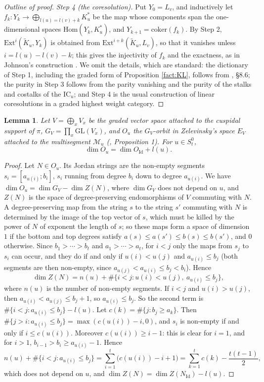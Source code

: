 \documentclass[a4paper,12pt,leqno]{amsart}
\newcommand{\caM}{\mathcal{M}}
\theoremstyle{plain}
\newtheorem{lemma}[thm]{Lemma}
\theoremstyle{definition}
\theoremstyle{definition}
\newcommand{\Id}{\mathrm{Id}}
\begin{document}
\begin{proof}[Outline of proof]
\emph{Step 4 (the coresolution).} Put $Y_0=L_v$, and inductively let $f_k:Y_k\to\bigoplus_{l(u)=l(v)+k}
K_u^*$ be the map whose components span the one-dimensional spaces $\mathrm{Hom}(Y_k,K_u^*)$, and
$Y_{k+1}=\mathrm{coker}(f_k)$. By Step 2, $\mathrm{Ext}^i(\widetilde K_u,Y_k)$ is obtained from
$\mathrm{Ext}^{i+k}(\widetilde K_u,L_v)$, so that it vanishes unless $i=l(u)-l(v)-k$; this gives the
injectivity of $f_k$ and the exactness, as in Johnson's construction \cite{Joh84}. We omit the details, which are standard: the dictionary of
Step 1, including the graded form of Proposition \ref{fact:KL}, follows from \cite{CG97}, \S8.6; the
purity in Step 3 follows from the parity vanishing and the purity of the stalks and costalks of the
$\mathrm{IC}_u$; and Step 4 is the usual construction of linear coresolutions in a graded highest
weight category.
\end{proof}

\begin{lemma}\label{lem:dimorb} Let $V=\bigoplus_xV_x$ be the graded vector space attached to the
cuspidal support of $\pi$, $G_V=\prod_x\mathrm{GL}(V_x)$, and $O_u$ the $G_V$-orbit in Zelevinsky's
space $E_V$ attached to the multisegment $\caM_u$ (\cite{Zel85}, Proposition 1). For $u\in S_t^0$,
\[\dim O_u=\dim O_{\Id}+l(u).\]
\end{lemma}

\begin{proof}
Let $N\in O_u$. Its Jordan strings are the non-empty segments $s_i=[a_{u(i)};b_i]$, $s_i$ running from
degree $b_i$ down to degree $a_{u(i)}$. We have $\dim O_u=\dim G_V-\dim Z(N)$, where $\dim G_V$ does not
depend on $u$, and $Z(N)$ is the space of degree-preserving endomorphisms of $V$ commuting with $N$.
A degree-preserving map from the string $s$ to the string $s'$ commuting with $N$ is determined by the
image of the top vector of $s$, which must be killed by the power of $N$ of exponent the length of $s$;
so these maps form a space of dimension $1$ if the bottom and top degrees satisfy
$a(s)\leq a(s')\leq b(s)\leq b(s')$, and $0$ otherwise. Since $b_1>\cdots>b_t$ and $a_1>\cdots>a_t$, for
$i<j$ only the maps from $s_j$ to $s_i$ can occur, and they do if and only if $u(i)<u(j)$ and
$a_{u(i)}\leq b_j$ (both segments are then non-empty, since $a_{u(j)}<a_{u(i)}\leq b_j<b_i$). Hence
\[\dim Z(N)=n(u)+\#\{i<j:u(i)<u(j),\ a_{u(i)}\leq b_j\},\]
where $n(u)$ is the number of non-empty segments. If $i<j$ and $u(i)>u(j)$, then $a_{u(i)}<a_{u(j)}\leq
b_j+1$, so $a_{u(i)}\leq b_j$. So the second term is $\#\{i<j:a_{u(i)}\leq b_j\}-l(u)$. Let
$c(k)=\#\{j:b_j\geq a_k\}$. Then $\#\{j>i:a_{u(i)}\leq b_j\}=\max(c(u(i))-i,0)$, and $s_i$ is non-empty if and
only if $i\leq c(u(i))$. Moreover $c(u(i))\geq i-1$: this is clear for $i=1$, and for $i>1$,
$b_{i-1}>b_i\geq a_{u(i)}-1$. Hence
\[n(u)+\#\{i<j:a_{u(i)}\leq b_j\}=\sum_{i=1}^t\big(c(u(i))-i+1\big)=\sum_{k=1}^tc(k)-\frac{t(t-1)}2,\]
which does not depend on $u$, and $\dim Z(N)=\dim Z(N_{\Id})-l(u)$.
\end{proof}
\end{document}
